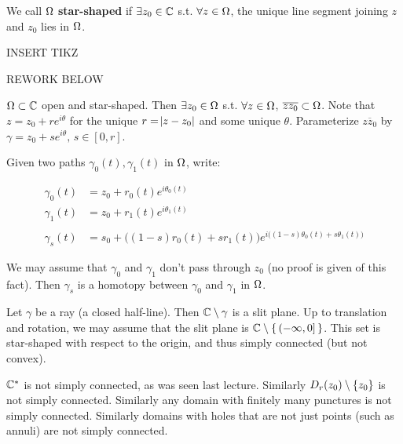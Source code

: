 \begin{definition}

We call $\Omega$ \textbf{star-shaped} if $\exists z_0 \in \mathbb{C}$ s.t. $\forall z \in \Omega$, the unique line segment joining $z$ and $z_0$ lies in $\Omega$.
\end{definition}

INSERT TIKZ

REWORK BELOW
\begin{proposition}
$\Omega \subset \mathbb{C}$ open and star-shaped. Then $\exists z_0 \in \Omega$ s.t. $\forall z \in \Omega$, $\overline{z z_0} \subset \Omega$. Note that $z=z_0 + re^{i \theta} $ for the unique $r = \abs{z-z_0}$ and some unique $\theta$. Parameterize $\overline{z z_0}$ by $\gamma = z_0 + s e^{i \theta}, \, s \in [0,r]$.

Given two paths $\gamma_0 (t), \gamma_1 (t)$ in $\Omega$, write:

\begin{align*}
\gamma_0(t) &= z_0 + r_0 (t) e^{i \theta_0 (t)}\\
\gamma_1(t) &= z_0 + r_1 (t) e^{i \theta_1 (t)}\\\\
\gamma_s(t) &= s_0 + \big( (1-s)r_0(t) + sr_1(t) \big) e^{i \big( (1-s) \theta_0 (t) + s \theta_1 (t) \big)} 
\end{align*}


We may assume that $\gamma_0$ and $\gamma_1$ don't pass through $z_0$ (no proof is given of this fact). Then $\gamma_s$ is a homotopy between $\gamma_0$ and $\gamma_1$ in $\Omega$.

\end{proposition}


\begin{example}
Let $\gamma$ be a ray (a closed half-line).
Then $\mathbb{C} \setminus \gamma$ is a slit plane. Up to translation and rotation, we may assume that the slit plane is $\mathbb{C} \setminus \set{(-\infty , 0] }$. This set is star-shaped with respect to the origin, and thus simply connected (but not convex).

\end{example}


\begin{counterexample}
$\mathbb{C}^*$ is not simply connected, as was seen last lecture. Similarly $D_r (z_0) \setminus \{ z_0 \}$ is not simply connected. Similarly any domain with finitely many punctures is not simply connected. Similarly domains with holes that are not just points (such as annuli) are not simply connected.
\end{counterexample}

